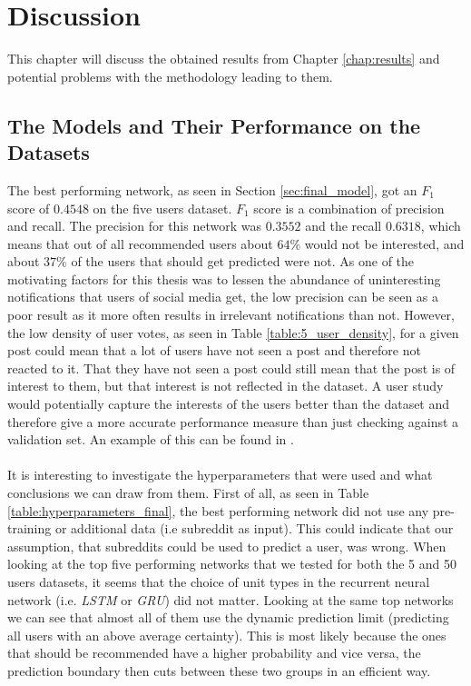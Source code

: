 \chapter{Discussion}\label{chap:discussion}

This chapter will discuss the obtained results from Chapter \ref{chap:results} and potential problems with the methodology leading to them.

\section{The Models and Their Performance on the Datasets}
The best performing network, as seen in Section \ref{sec:final_model}, got an $F_1$ score of $0.4548$ on the five users dataset. $F_1$ score is a combination of precision and recall. The precision for this network was $0.3552$ and the recall $0.6318$, which means that out of all recommended users about $64\%$ would not be interested, and about $37\%$ of the users that should get predicted were not. As one of the motivating factors for this thesis was to lessen the abundance of uninteresting notifications that users of social media get, the low precision can be seen as a poor result as it more often results in irrelevant notifications than not. However, the low density of user votes, as seen in Table \ref{table:5_user_density}, for a given post could mean that a lot of users have not seen a post and therefore not reacted to it. That they have not seen a post could still mean that the post is of interest to them, but that interest is not reflected in the dataset. A user study would potentially capture the interests of the users better than the dataset and therefore give a more accurate performance measure than just checking against a validation set. An example of this can be found in \cite{suorra2016assisting}.
\\\\
It is interesting to investigate the hyperparameters that were used and what conclusions we can draw from them. First of all, as seen in Table \ref{table:hyperparameters_final}, the best performing network did not use any pre-training or additional data (i.e subreddit as input). This could indicate that our assumption, that subreddits could be used to predict a user, was wrong. When looking at the top five performing networks that we tested for both the 5 and 50 users datasets, it seems that the choice of unit types in the recurrent neural network (i.e. \textit{LSTM} or \textit{GRU}) did not matter. Looking at the same top networks we can see that almost all of them use the dynamic prediction limit (predicting all users with an above average certainty). This is most likely because the ones that should be recommended have a higher probability and vice versa, the prediction boundary then cuts between these two groups in an efficient way.
